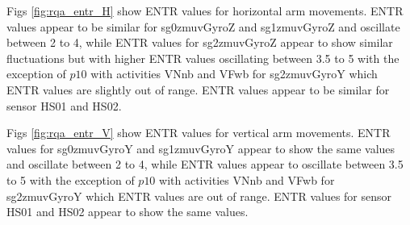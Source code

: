 Figs \ref{fig:rqa_entr_H} show ENTR values for horizontal arm movements.
ENTR values appear to be similar for sg0zmuvGyroZ and sg1zmuvGyroZ 
and oscillate between 2 to 4, while ENTR values for sg2zmuvGyroZ appear 
to show similar fluctuations but with higher ENTR values oscillating 
between 3.5 to 5  with the exception of $p10$ with activities VNnb and VFwb 
for sg2zmuvGyroY which ENTR values are slightly out of range.
ENTR values appear to be similar for sensor HS01 and HS02.

Figs \ref{fig:rqa_entr_V} show ENTR values for vertical arm movements.
ENTR values for sg0zmuvGyroY and sg1zmuvGyroY appear to show the same
values and oscillate between 2 to 4, while ENTR values appear to oscillate
between 3.5 to 5 with the exception of $p10$ with activities VNnb and VFwb 
for sg2zmuvGyroY which ENTR values are out of range.
ENTR values for sensor HS01 and HS02 appear to show the same values. 




